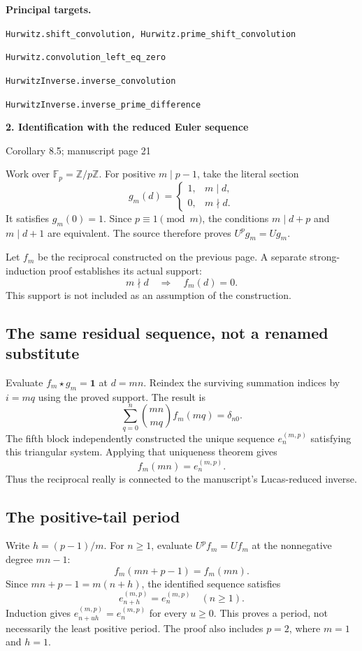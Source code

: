 \documentclass[11pt]{article}
\newcommand{\Z}{\mathbb Z}\newcommand{\N}{\mathbb N}\newcommand{\Q}{\mathbb Q}\newcommand{\F}{\mathbb F}
\newcommand{\target}[1]{{\footnotesize\texttt{#1}}}
\newcommand{\pageheading}[2]{{\Large\bfseries\color{ink}#1}\par{\small #2}\par\medskip}
\begin{document}
\textbf{Principal targets.}\par
\target{Hurwitz.shift\_convolution, Hurwitz.prime\_shift\_convolution}\par
\target{Hurwitz.convolution\_left\_eq\_zero}\par
\target{HurwitzInverse.inverse\_convolution}\par
\target{HurwitzInverse.inverse\_prime\_difference}

\newpage
\pageheading{2. Identification with the reduced Euler sequence}{Corollary 8.5; manuscript page 21}
Work over $\F_p=\Z/p\Z$. For positive $m\mid p-1$, take the literal section
\[
 g_m(d)=\begin{cases}1,&m\mid d,\\0,&m\nmid d.\end{cases}
\]
It satisfies $g_m(0)=1$. Since $p\equiv1\pmod m$, the conditions $m\mid d+p$ and $m\mid d+1$ are equivalent. The source therefore proves $U^pg_m=Ug_m$.

Let $f_m$ be the reciprocal constructed on the previous page. A separate strong-induction proof establishes its actual support:
\[
 m\nmid d\quad\Longrightarrow\quad f_m(d)=0.
\]
This support is not included as an assumption of the construction.

\subsection*{The same residual sequence, not a renamed substitute}
Evaluate $f_m\star g_m=\mathbf1$ at $d=mn$. Reindex the surviving summation indices by $i=mq$ using the proved support. The result is
\[
 \sum_{q=0}^{n}\binom{mn}{mq}f_m(mq)=\delta_{n0}.
\]
The fifth block independently constructed the unique sequence $e_n^{(m,p)}$ satisfying this triangular system. Applying that uniqueness theorem gives
\[
 \boxed{f_m(mn)=e_n^{(m,p)}.}
\]
Thus the reciprocal really is connected to the manuscript's Lucas-reduced inverse.

\subsection*{The positive-tail period}
Write $h=(p-1)/m$. For $n\ge1$, evaluate $U^pf_m=Uf_m$ at the nonnegative degree $mn-1$:
\[
 f_m(mn+p-1)=f_m(mn).
\]
Since $mn+p-1=m(n+h)$, the identified sequence satisfies
\[
 \boxed{e_{n+h}^{(m,p)}=e_n^{(m,p)}\quad(n\ge1).}
\]
Induction gives $e_{n+uh}^{(m,p)}=e_n^{(m,p)}$ for every $u\ge0$. This proves a period, not necessarily the least positive period. The proof also includes $p=2$, where $m=1$ and $h=1$.
\end{document}
